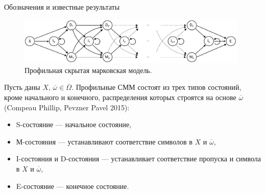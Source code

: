 \documentclass[ucs, notheorems, handout, 10pt]{beamer}
\begin{document}
	\begin{frame}{Обозначения и известные результаты}				
		\begin{figure}[h]
			\includegraphics[width=11cm]{../../report/figure2}
			\caption{Профильная скрытая марковская модель.}  \label{fg:3}
		\end{figure}	
		
		Пусть даны $X$, $\overline{\omega} \in \overline{\Omega}$. Профильные СММ состоят из трех типов состояний, кроме начального и конечного, распределения которых строятся на основе $\overline{\omega}$ (Compeau Phillip, Pevzner Pavel 2015):
		\begin{itemize}
			\item S-состояние --- начальное состояние,
			\item М-состояния --- устанавливают соответствие символов в $X$ и $\overline{\omega}$,
			\item I-состояния и D-состояния --- устанавливает соответствие пропуска и символа в $X$ и $\overline{\omega}$,
			\item E-состояние --- конечное состояние.
		\end{itemize}
		
	\end{frame}
\end{document}
